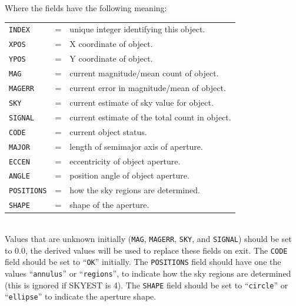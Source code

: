 \documentclass[twoside,11pt]{article}
\renewcommand{\_}{\texttt{\symbol{95}}}
\newcommand{\ft}[1]{``\texttt{#1}''}
\begin{document}
{{{        Where the fields have the following meaning:\\
        \begin{tabular}{lll}
           \texttt{INDEX}   &  = & unique integer identifying this object. \\
           \texttt{XPOS}    &  = & X coordinate of object.\\
           \texttt{YPOS}    &  = & Y coordinate of object.\\
           \texttt{MAG}     &  = & current magnitude/mean count of object.\\
           \texttt{MAGERR}  &  = & current error in magnitude/mean of object.\\
           \texttt{SKY}     &  = & current estimate of sky value for object.\\
           \texttt{SIGNAL}  &  = & current estimate of the total count in object.\\
           \texttt{CODE}    & =  & current object status.\\
           \texttt{MAJOR}   & =  & length of semimajor axis of aperture.\\
           \texttt{ECCEN}   &  = & eccentricity of object aperture.\\
           \texttt{ANGLE}   &  = & position angle of object aperture.\\
           \texttt{POSITIONS} &= & how the sky regions are determined.\\
           \texttt{SHAPE}     &= & shape of the aperture.\\
        \end{tabular}\\
       Values that are unknown initially (\texttt{MAG}, \texttt{MAGERR},
       \texttt{SKY}, and \texttt{SIGNAL})
       should be set to 0.0, the derived values will be used to replace
       these fields on exit. The \texttt{CODE} field should be set to \ft{OK}
       initially. The \texttt{POSITIONS} field should have one the values
       \ft{annulus} or \ft{regions}, to indicate how
       the sky regions are determined (this is ignored if SKYEST is 4).
       The \texttt{SHAPE} field should be set to \ft{circle} or
       \ft{ellipse} to indicate the aperture shape.\\

}}}
\end{document}
